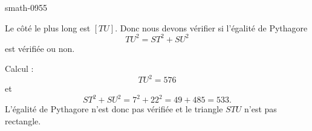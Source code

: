 
\begin{corrige}{smath-0955}

    Le côté le plus long est \( [TU]\). Donc nous devons vérifier si l'égalité de Pythagore
    \begin{equation}
        TU^2=ST^2+SU^2
    \end{equation}
    est vérifiée ou non.

    Calcul :
    \begin{equation}
        TU^2=576
    \end{equation}
    et
    \begin{equation}
        ST^2+SU^2=7^2+22^2=49+485=533.
    \end{equation}
    L'égalité de Pythagore n'est donc pas vérifiée et le triangle \( STU\) n'est pas rectangle.

\end{corrige}
